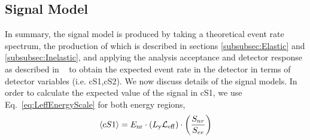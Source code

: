 \subsection{Signal Model}
\label{subsec:SignalModel}
In summary, the signal model is produced by taking a theoretical event rate spectrum, the production of which is described in sections \ref{subsubsec:Elastic} and \ref{subsubsec:Inelastic}, and applying the analysis acceptance and detector response as described in ~\cite{xe100_ana2012}  to obtain the expected event rate in the detector in terms of detector variables (i.e. cS1,cS2). We now discuss details of the signal models. In order to calculate the expected value of the signal in cS1, we use Eq.~\ref{eq:LeffEnergyScale} for both energy regions, 
\begin{equation}
\label{eq:LeffEnergyScale}
	\langle cS1 \rangle = E_{\mathrm{nr}} \cdot (L_{\mathrm{y}} \mathcal{L}_{\mathrm{eff}}) \cdot   \left(\frac{S_{nr}}{S_{ee}}\right) 
\end{equation}

%
%
%

